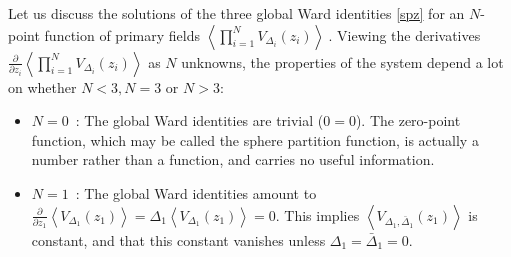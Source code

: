 \documentclass[12pt, a4paper, notitlepage, twoside]{report}
\numberwithin{equation}{section}
\theoremstyle{break}
\begin{document}
Let us discuss the solutions of the three global Ward identities \eqref{spz} for an $N$-point function of primary fields
$
\left\langle \prod_{i=1}^N V_{\Delta_i}(z_i) \right\rangle\ .
$
Viewing the derivatives $\frac{\partial}{\partial z_i}\left\langle \prod_{i=1}^N V_{\Delta_i}(z_i) \right\rangle$ as $N$ unknowns, the properties of the system depend a lot on whether $N<3, N=3$ or $N>3$:
\begin{itemize}
 \item $\boxed{N=0}$\ : The global Ward identities are trivial ($0=0$).
The zero-point function, which may be called the sphere partition function, is actually a number rather than a function, and carries no useful information.

\item $\boxed{N=1}$\ :  The global Ward identities amount to $\frac{\partial}{\partial z_1}\left\langle V_{\Delta_1}(z_1)\right\rangle  =\Delta_1 \left\langle V_{\Delta_1}(z_1)\right\rangle =0$.
This implies $\left\langle V_{\Delta_1,\bar\Delta_1}(z_1)\right\rangle$ is constant, and that this constant vanishes unless $\Delta_1=\bar\Delta_1=0$.


\end{itemize}
\end{document}
